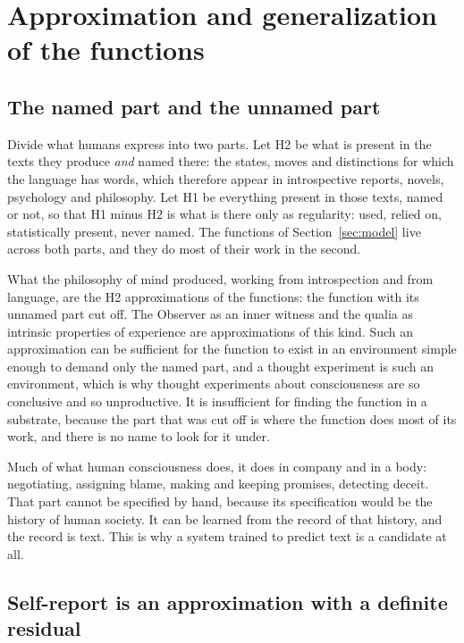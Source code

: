 \section{Approximation and generalization of the functions}
\label{sec:generalization}

\subsection{The named part and the unnamed part}
\label{sec:h1h2}
\label{sec:record}

Divide what humans express into two parts. Let H2 be what is present in the texts they produce
\emph{and} named there: the states, moves and distinctions for which the language has words, which
therefore appear in introspective reports, novels, psychology and philosophy. Let H1 be everything
present in those texts, named or not, so that H1 minus H2 is what is there only as regularity: used,
relied on, statistically present, never named. The functions of Section~\ref{sec:model} live across
both parts, and they do most of their work in the second.

What the philosophy of mind produced, working from introspection and from language, are the H2
approximations of the functions: the function with its unnamed part cut off. The Observer as an inner
witness and the qualia as intrinsic properties of experience are approximations of this kind. Such an
approximation can be sufficient for the function to exist in an environment simple enough to demand
only the named part, and a thought experiment is such an environment, which is why thought experiments
about consciousness are so conclusive and so unproductive. It is insufficient for finding the function
in a substrate, because the part that was cut off is where the function does most of its work, and
there is no name to look for it under.

Much of what human consciousness does, it does in company and in a body: negotiating, assigning blame,
making and keeping promises, detecting deceit. That part cannot be specified by hand, because its
specification would be the history of human society. It can be learned from the record of that history,
and the record is text. This is why a system trained to predict text is a candidate at all.

\subsection{Self-report is an approximation with a definite residual}
\label{sec:approximation}

